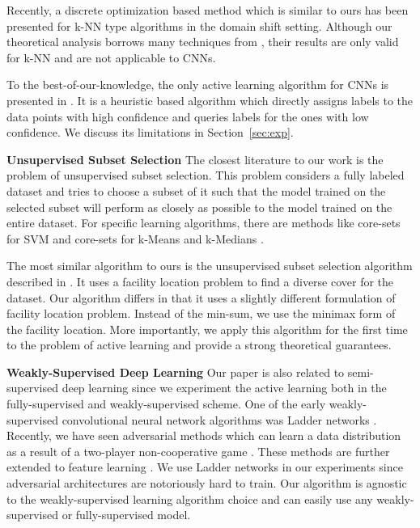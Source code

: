 \documentclass{article}
\begin{document}
Recently, a discrete optimization based method \cite{BerlindU15} which is similar to ours has been presented for k-NN type algorithms in the domain shift setting. Although our theoretical analysis borrows many techniques from \cite{BerlindU15}, their results are only valid for k-NN and are not applicable to CNNs.

To the best-of-our-knowledge, the only active learning algorithm for CNNs is presented in \cite{wang2016cost}. It is a heuristic based algorithm which directly assigns labels to the data points with high confidence and queries labels for the ones with low confidence. We discuss its limitations in Section~\ref{sec:exp}.

\noindent\textbf{Unsupervised Subset Selection}
The closest literature to our work is the problem of unsupervised subset selection. This problem considers a fully labeled dataset and tries to choose a subset of it such that the model trained on the selected subset will perform as closely as possible to the model trained on the entire dataset. For specific learning algorithms, there are methods like core-sets for SVM \cite{tsang2005core} and core-sets for k-Means and k-Medians \cite{har2005smaller}. %

The most similar algorithm to ours is the unsupervised subset selection algorithm described in \cite{wei2013using}. It uses a facility location problem to find a diverse cover for the dataset. Our algorithm differs in that it uses a slightly different formulation of facility location problem. Instead of the min-sum, we use the minimax \cite{facility} form of the facility location. More importantly, we apply this algorithm for the first time to the problem of active learning and provide a strong theoretical guarantees.
 
\noindent\textbf{Weakly-Supervised Deep Learning}
Our paper is also related to semi-supervised deep learning since we experiment the active learning both in the fully-supervised and weakly-supervised scheme. 
One of the early weakly-supervised convolutional neural network algorithms was Ladder networks \cite{ladder}. Recently, we have seen adversarial methods which can learn a data distribution as a result of a two-player non-cooperative game \cite{salimans2016improved,gan_original,dcgan}. These methods are further extended to feature learning \cite{ali, bigan}. We use Ladder networks in our experiments since adversarial architectures are notoriously hard to train. Our algorithm is agnostic to the weakly-supervised learning algorithm choice and can easily use any weakly-supervised or fully-supervised model.
\end{document}
